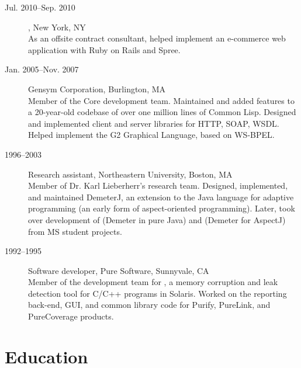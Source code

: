 \documentclass{article}
\begin{document}
\begin{description}
\item[Jul. 2010--Sep. 2010]
{\large {}},
New York, NY \\
As an offsite contract consultant, helped implement an e-commerce web
application with Ruby on Rails and Spree.

\item[Jan. 2005--Nov. 2007]
{\large Gensym Corporation}, Burlington, MA \\
Member of the 
Core development team.  Maintained and added features to a
20-year-old codebase of over one million lines of Common Lisp.
Designed and implemented client and server libraries for HTTP, SOAP,
WSDL.  Helped implement the G2 Graphical Language, based on WS-BPEL.

\item[1996--2003] 
{\large Research assistant, Northeastern University}, Boston, MA \\
Member of Dr. Karl Lieberherr's
 research
team.  Designed, implemented, and maintained DemeterJ, an extension to
the Java language for adaptive programming (an early form of
aspect-oriented programming).  Later, took over development of
 (Demeter in pure Java) and
 (Demeter for AspectJ)
from MS student projects.

\item[1992--1995]
{\large Software developer, Pure Software}, Sunnyvale, CA \\
Member of the development team for
, a
memory corruption and leak detection tool for C/C++ programs in
Solaris.  Worked on the reporting back-end, GUI, and common library
code for Purify, PureLink, and PureCoverage products.
\end{description}

\section*{Education}
\end{document}
